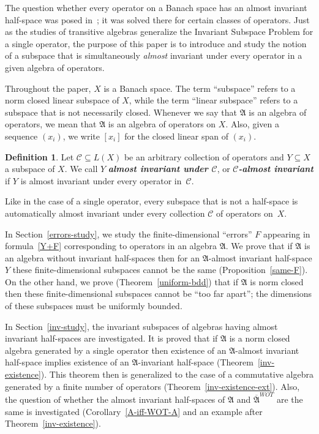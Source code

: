 \documentclass[12pt]{amsart}
\theoremstyle{plain}
\theoremstyle{definition}
\newtheorem{definition}[theorem]{Definition}
\theoremstyle{remark}
\begin{document}
The question whether every operator on a Banach space has an almost invariant half-space was posed in~\cite{APTT}; it was solved there for certain classes of operators. Just as the studies of transitive algebras generalize the Invariant Subspace Problem for a single operator, the purpose of this paper is to introduce and study the notion of a subspace that is simultaneously \emph{almost} invariant under every operator in a given algebra of operators.

Throughout the paper, $X$ is a Banach space. The term ``subspace'' refers to a norm closed linear subspace of $X$, while the term ``linear subspace'' refers to a subspace that is not necessarily closed. Whenever we say that $\mathfrak A$ is an algebra of operators, we mean that $\mathfrak A$ is an algebra of operators on $X$. Also, given a sequence $(x_i)$, we write $[x_i]$ for the closed linear span of $(x_i)$.

\begin{definition}
Let $\mathcal C\subseteq L(X)$ be an arbitrary collection of operators and $Y\subseteq X$ a subspace of $X$. We call  $Y$ {{\textit{\textbf{{almost invariant under $\mathcal C$}}}}}, or {{\textit{\textbf{{$\mathcal C$-almost invariant}}}}} if $Y$ is almost invariant under every operator in~$\mathcal C$.
\end{definition}

Like in the case of a single operator, every subspace that is not a half-space is automatically almost invariant under every collection $\mathcal C$ of operators on~$X$.

In Section~\ref{errors-study}, we study the finite-dimensional ``errors'' $F$ appearing in formula~\eqref{Y+F} corresponding to operators in an algebra $\mathfrak A$. We prove that if $\mathfrak A$ is an algebra without invariant half-spaces then for an $\mathfrak A$-almost invariant half-space $Y$ these finite-dimensional subspaces cannot be the same (Proposition~\ref{same-F}). On the other hand, we prove (Theorem~\ref{uniform-bdd}) that if $\mathfrak A$ is norm closed then these finite-dimensional subspaces cannot be ``too far apart''; the dimensions of these subspaces must be uniformly bounded.

In Section~\ref{inv-study}, the invariant subspaces of algebras having almost invariant half-spaces are investigated. It is proved that if $\mathfrak A$ is
a norm closed algebra generated by a single operator then existence of an $\mathfrak A$-almost invariant half-space implies existence of an $\mathfrak A$-invariant half-space (Theorem~\ref{inv-existence}). This theorem then is generalized to the case of a commutative algebra generated by a finite number of operators (Theorem~\ref{inv-existence-ext}). Also, the question of whether the almost invariant half-spaces of $\mathfrak A$ and $\overline{\mathfrak A}^{WOT}$ are the same is investigated (Corollary~\ref{A-iff-WOT-A} and an example after Theorem~\ref{inv-existence}).
\end{document}
